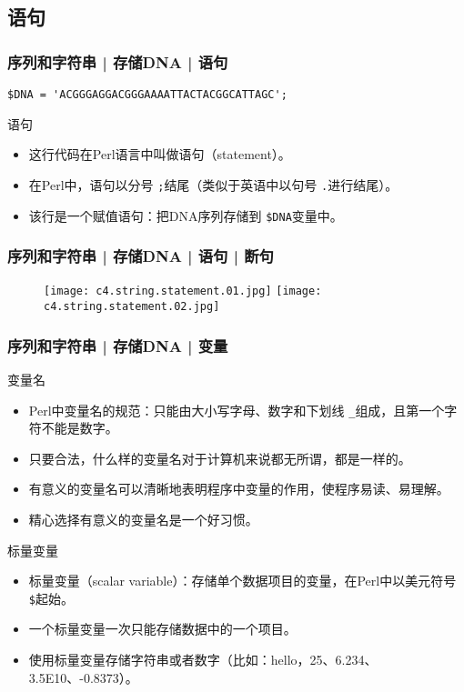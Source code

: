 \subsection{语句}
\begin{frame}[fragile]
  \frametitle{序列和字符串 | 存储DNA | \alert{语句}}
\begin{lstlisting}
$DNA = 'ACGGGAGGACGGGAAAATTACTACGGCATTAGC';
\end{lstlisting}
\pause
\begin{block}{语句}
  \begin{itemize}
    \item 这行代码在Perl语言中叫做语句（statement）。
    \item 在Perl中，语句以分号 \verb|;|结尾（类似于英语中以句号 \verb|.|进行结尾）。
    \item 该行是一个赋值语句：把DNA序列存储到 \verb|$DNA|变量中。
  \end{itemize}
\end{block}
\end{frame}

\begin{frame}
  \frametitle{序列和字符串 | 存储DNA | 语句 | 断句}
  \begin{figure}
    \centering
    \texttt{[image: c4.string.statement.01.jpg]}
    \quad
    \texttt{[image: c4.string.statement.02.jpg]}
  \end{figure}
\end{frame}

\begin{frame}[fragile]
  \frametitle{序列和字符串 | 存储DNA | \alert{变量}}
  \begin{block}{变量名}
  \begin{itemize}
    \item Perl中变量名的规范：只能由大小写字母、数字和下划线 \verb|_|组成，且第一个字符不能是数字。
    \item 只要合法，什么样的变量名对于计算机来说都无所谓，都是一样的。
    \item 有意义的变量名可以清晰地表明程序中变量的作用，使程序易读、易理解。
    \item 精心选择有意义的变量名是一个好习惯。
  \end{itemize}
  \end{block}
  \pause
  \begin{block}{标量变量}
    \begin{itemize}
      \item 标量变量（scalar variable）：存储单个数据项目的变量，在Perl中以美元符号 \verb|$|起始。
      \item 一个标量变量一次只能存储数据中的一个项目。
      \item 使用标量变量存储字符串或者数字（比如：hello，25、6.234、3.5E10、-0.8373）。
    \end{itemize}
  \end{block}
\end{frame}


